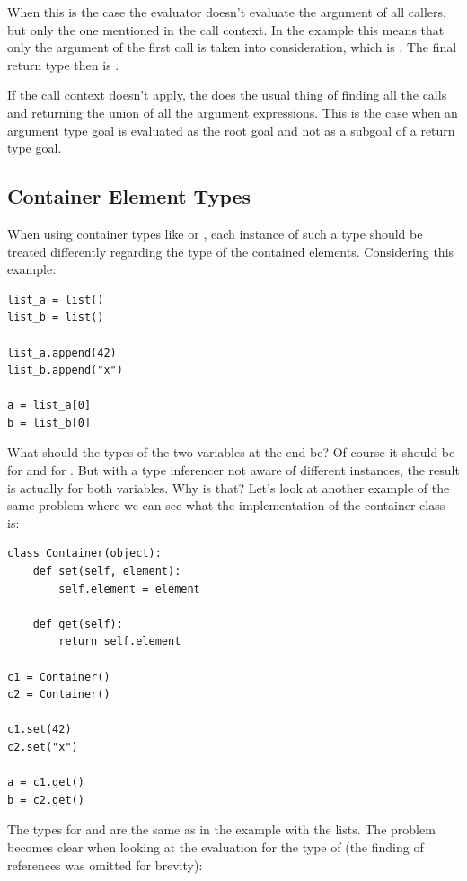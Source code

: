 \documentclass[12pt,halfparskip,DIV11,BCOR10mm]{scrreprt}
\begin{document}
When this is the case the evaluator doesn't evaluate the argument of all callers, but only the one mentioned in the call context. In the example this means that only the argument of the first call is taken into consideration, which is . The final return type then is .

If the call context doesn't apply, the  does the usual thing of finding all the calls and returning the union of all the argument expressions. This is the case when an argument type goal is evaluated as the root goal and not as a subgoal of a return type goal.


\subsection{Container Element Types}
\label{container_element_types}

When using container types like  or , each instance of such a type should be treated differently regarding the type of the contained elements. Considering this example:

\begin{lstlisting}
list_a = list()
list_b = list()

list_a.append(42)
list_b.append("x")

a = list_a[0]
b = list_b[0]
\end{lstlisting}

What should the types of the two variables at the end be? Of course it should be  for  and  for . But with a type inferencer not aware of different instances, the result is actually  for both variables. Why is that? Let's look at another example of the same problem where we can see what the implementation of the container class is:

\begin{lstlisting}
class Container(object):
    def set(self, element):
        self.element = element

    def get(self):
        return self.element

c1 = Container()
c2 = Container()

c1.set(42)
c2.set("x")

a = c1.get()
b = c2.get()
\end{lstlisting}

The types for  and  are the same as in the example with the lists. The problem becomes clear when looking at the evaluation for the type of  (the finding of references was omitted for brevity):
\end{document}
